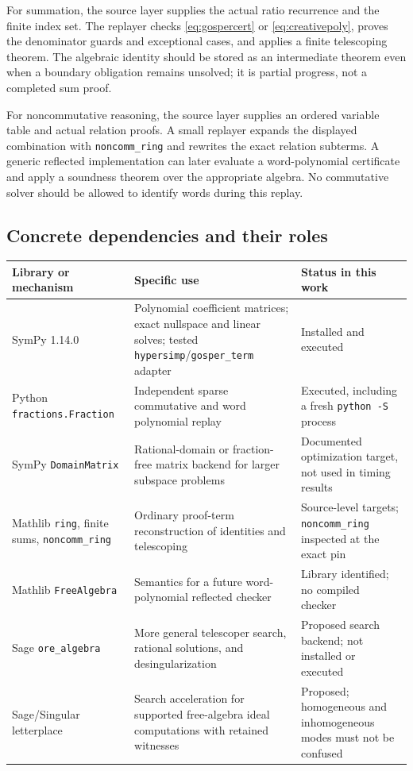 \documentclass[11pt,letterpaper]{article}
\newcommand{\code}[1]{\texttt{#1}}
\theoremstyle{definition}\newtheorem{definition}[theorem]{Definition}
\theoremstyle{remark}\newtheorem{remark}[theorem]{Remark}
\begin{document}
For summation, the source layer supplies the actual ratio recurrence and the
finite index set. The replayer checks \eqref{eq:gospercert} or
\eqref{eq:creativepoly}, proves the denominator guards and exceptional cases,
and applies a finite telescoping theorem. The algebraic identity should be
stored as an intermediate theorem even when a boundary obligation remains
unsolved; it is partial progress, not a completed sum proof.

For noncommutative reasoning, the source layer supplies an ordered variable
table and actual relation proofs. A small replayer expands the displayed
combination with \code{noncomm\_ring} and rewrites the exact relation subterms.
A generic reflected implementation can later evaluate a word-polynomial
certificate and apply a soundness theorem over the appropriate algebra.
No commutative solver should be allowed to identify words during this replay.

\subsection{Concrete dependencies and their roles}
\begin{longtable}{@{}p{}p{}p{}@{}}
\toprule
Library or mechanism & Specific use & Status in this work\\
\midrule\endhead
SymPy 1.14.0 & Polynomial coefficient matrices; exact nullspace and linear
solves; tested \code{hypersimp}/\code{gosper\_term} adapter & Installed and
executed\\
Python \code{fractions.Fraction} & Independent sparse commutative and word
polynomial replay & Executed, including a fresh \code{python -S} process\\
SymPy \code{DomainMatrix} & Rational-domain or fraction-free matrix backend for
larger subspace problems & Documented optimization target, not used in timing
results~\cite{domainmatrix}\\
Mathlib \code{ring}, finite sums, \code{noncomm\_ring} & Ordinary proof-term
reconstruction of identities and telescoping & Source-level targets;
\code{noncomm\_ring} inspected at the exact pin~\cite{noncomm-ring}\\
Mathlib \code{FreeAlgebra} & Semantics for a future word-polynomial reflected
checker & Library identified; no compiled checker~\cite{free-algebra}\\
Sage \code{ore\_algebra} & More general telescoper search, rational solutions,
and desingularization & Proposed search backend; not installed or
executed~\cite{ore-algebra}\\
Sage/Singular letterplace & Search acceleration for supported free-algebra
ideal computations with retained witnesses & Proposed; homogeneous and
inhomogeneous modes must not be confused~\cite{letterplace,nongraded-letterplace}\\
\bottomrule
\end{longtable}
\end{document}
